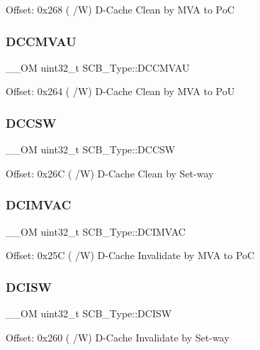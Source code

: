 Offset\+: 0x268 ( /W) D-\/\+Cache Clean by M\+VA to PoC \mbox{\label{struct_s_c_b___type_aae3caeea159ab54859ea11397f942cfa}} 
\subsubsection{\texorpdfstring{DCCMVAU}{DCCMVAU}}
{\footnotesize\ttfamily \+\_\+\+\_\+\+OM uint32\+\_\+t S\+C\+B\+\_\+\+Type\+::\+D\+C\+C\+M\+V\+AU}

Offset\+: 0x264 ( /W) D-\/\+Cache Clean by M\+VA to PoU \mbox{\label{struct_s_c_b___type_ab95cc818be9fa7d25ae516f3fe6b7788}} 
\subsubsection{\texorpdfstring{DCCSW}{DCCSW}}
{\footnotesize\ttfamily \+\_\+\+\_\+\+OM uint32\+\_\+t S\+C\+B\+\_\+\+Type\+::\+D\+C\+C\+SW}

Offset\+: 0x26C ( /W) D-\/\+Cache Clean by Set-\/way \mbox{\label{struct_s_c_b___type_a4be79491ab1ed14f3b0237ba7e69063c}} 
\subsubsection{\texorpdfstring{DCIMVAC}{DCIMVAC}}
{\footnotesize\ttfamily \+\_\+\+\_\+\+OM uint32\+\_\+t S\+C\+B\+\_\+\+Type\+::\+D\+C\+I\+M\+V\+AC}

Offset\+: 0x25C ( /W) D-\/\+Cache Invalidate by M\+VA to PoC \mbox{\label{struct_s_c_b___type_a22bcfd7e1bffebdbe98cdbc8d77a2f42}} 
\subsubsection{\texorpdfstring{DCISW}{DCISW}}
{\footnotesize\ttfamily \+\_\+\+\_\+\+OM uint32\+\_\+t S\+C\+B\+\_\+\+Type\+::\+D\+C\+I\+SW}

Offset\+: 0x260 ( /W) D-\/\+Cache Invalidate by Set-\/way \mbox{\label{struct_s_c_b___type_a85dd6fe77aab17e7ea89a52c59da6004}} 
